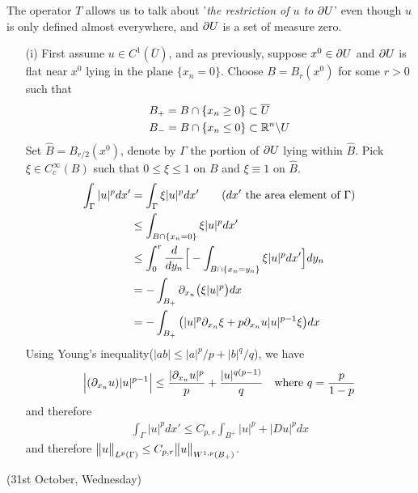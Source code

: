 \documentclass[12pt,a4paper]{report}
\newenvironment{proof}
{\begin{changemargin}{1cm}{0.5cm} 
	}%
	{\end{changemargin}
}
\begin{document}
The operator $T$ allows us to talk about '\emph{the restriction of $u$ to $\partial U$}' even though $u$ is only defined almost everywhere, and $\partial U$ is a set of measure zero.
\begin{proof}
\pf \begin{itemize}
\item[(i)] First assume $u\in C^1(\bar{U})$, and as previously, suppose $x^0 \in \partial U$ and $\partial U$ is flat near $x^0$ lying in the plane $\{x_n =0\}$. Choose $B = B_r(x^0)$ for some $r>0$ such that
\begin{align*}
& B_+ = B \cap \{x_n \geq 0 \} \subset \overline{U} \\
& B_- = B \cap \{x_n \leq 0 \} \subset \mathbb{R}^n \backslash U
\end{align*}
Set $\hat{B} = B_{r/2}(x^0)$, denote by $\Gamma$ the portion of $\partial U$ lying within $\hat{B}$. Pick $\xi \in C_c^{\infty}(B)$ such that $0\leq \xi \leq 1$ on $B$ and $\xi \equiv 1$ on $\hat{B}$. 
\begin{align*}
\int_{\Gamma} |u|^p dx'  &= \int_{\Gamma} \xi |u|^p dx' \quad \quad (dx' \text{ the area element of } \Gamma) \\
&\leq \int_{B\cap \{x_n =0\}} \xi |u|^p dx' \\
&\leq \int_{0}^r \frac{d}{dy_n} \Big[ - \int_{B\cap \{x_n = y_n \}} \xi |u|^p dx' \Big] dy_n \\
&= - \int_{B_+}  \partial_{x_n} \big(\xi |u|^p \big) dx \\
&= - \int_{B_+} \big( |u|^p \partial_{x_n}\xi  + p \partial_{x_n} u |u|^{p-1} \xi \big) dx
\end{align*}
Using Young's inequality($|ab| \leq |a|^p/p + |b|^q/q$), we have
\begin{align*}
\Big| (\partial_{x_n} u) |u|^{p-1} \Big| \leq \frac{|\partial_{x_n} u|^p}{p} + \frac{|u|^{q(p-1)}}{q} \quad \text{where } q = \frac{p}{1-p}
\end{align*}
and therefore
\begin{align*}
\int_{\Gamma} |u|^p dx' \leq C_{p,r} \int_{B^+} |u|^p + |Du|^p dx
\end{align*}
and therefore $\bigl\lVert u\bigr\rVert_{L^p(\Gamma)} \leq C_{p,r} \bigl\lVert u\bigr\rVert_{W^{1,p}(B_+)}$.
\end{itemize}
\end{proof}
\s

\newday

(31st October, Wednesday)
\s
\end{document}
